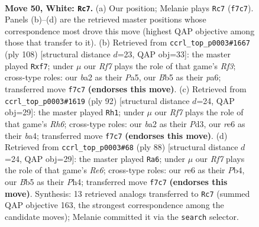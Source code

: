 \documentclass[11pt]{article}
\begin{document}
\clearpage

\begin{figure}[p]\centering
\begin{subfigure}{0.46\textwidth}\centering
\resizebox{\linewidth}{!}{%
\newchessgame
\chessboard[
  setfen={6k1/5R2/4r3/1B6/4p2p/4Bp1P/b4P1K/8 w - - 10 50},
  showmover=false,
  pgfstyle=straightmove, color=movearrow, markmove={f7-c7}
]}
\caption{}
\end{subfigure}\hfill
\begin{subfigure}{0.46\textwidth}\centering
\resizebox{\linewidth}{!}{%
\newchessgame
\chessboard[
  setfen={8/5p2/p2p4/P1b5/1pP3k1/5R2/KPB5/4r3 w - - 0 55},
  showmover=false,
  pgfstyle=straightmove, color=movearrow, markmove={f3-f7}
]}
\caption{}
\end{subfigure}
\\[4pt]
\begin{subfigure}{0.46\textwidth}\centering
\resizebox{\linewidth}{!}{%
\newchessgame
\chessboard[
  setfen={4r3/5pk1/3Bp2R/4P1P1/b4K2/3P4/8/8 w - - 16 47},
  showmover=false,
  pgfstyle=straightmove, color=movearrow, markmove={h6-h1}
]}
\caption{}
\end{subfigure}\hfill
\begin{subfigure}{0.46\textwidth}\centering
\resizebox{\linewidth}{!}{%
\newchessgame
\chessboard[
  setfen={b1r5/5kp1/4R2p/2B5/1P3p1P/8/5P1K/8 w - - 1 45},
  showmover=false,
  pgfstyle=straightmove, color=movearrow, markmove={e6-a6}
]}
\caption{}
\end{subfigure}
\caption{\textbf{Move 50, White: \texttt{Rc7}.} (a) Our position; Melanie plays \texttt{Rc7} (\texttt{f7c7}). Panels (b)--(d) are the retrieved master positions whose correspondence most drove this move (highest QAP objective among those that transfer to it). (b) Retrieved from \texttt{ccrl\_top\_p0003\#1667} (ply 108) [structural distance $d$=23, QAP obj=33]: the master played \texttt{Rxf7}; under $\mu$ our \emph{Rf7} plays the role of that game's \emph{Rf3}; cross-type roles: our \emph{b}a2 as their \emph{P}a5, our \emph{B}b5 as their \emph{p}a6; transferred move \texttt{f7c7} \textbf{(endorses this move)}. (c) Retrieved from \texttt{ccrl\_top\_p0003\#1619} (ply 92) [structural distance $d$=24, QAP obj=29]: the master played \texttt{Rh1}; under $\mu$ our \emph{Rf7} plays the role of that game's \emph{Rh6}; cross-type roles: our \emph{b}a2 as their \emph{P}d3, our \emph{r}e6 as their \emph{b}a4; transferred move \texttt{f7c7} \textbf{(endorses this move)}. (d) Retrieved from \texttt{ccrl\_top\_p0003\#68} (ply 88) [structural distance $d$=24, QAP obj=29]: the master played \texttt{Ra6}; under $\mu$ our \emph{Rf7} plays the role of that game's \emph{Re6}; cross-type roles: our \emph{r}e6 as their \emph{P}b4, our \emph{B}b5 as their \emph{P}h4; transferred move \texttt{f7c7} \textbf{(endorses this move)}. Synthesis: 13 retrieved analogs transferred to \texttt{Rc7} (summed QAP objective 163, the strongest correspondence among the candidate moves); Melanie committed it via the \texttt{search} selector.}
\label{fig:thought-m98}
\end{figure}
\end{document}
